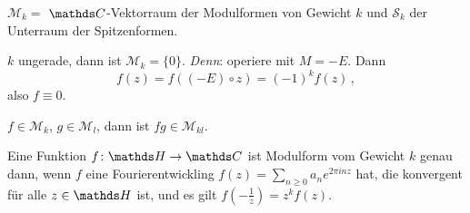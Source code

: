 \begin{nota}
$\mathcal{M}_k =$ $\CC$-Vektorraum der Modulformen von Gewicht $k$ und $\mathcal{S}_k$ der Unterraum der Spitzenformen.
\end{nota}

\begin{beme-list}
\item $k$ ungerade, dann ist $\mathcal{M}_k = \{0\}$.
\emph{Denn}: operiere mit $M = -E$. Dann
\[
    f(z) = f((-E) \circ z) = (-1)^k f(z)
    \,,
\]
also $f \equiv 0$.
\item $f \in \mathcal{M}_k$, $g\in \mathcal{M}_l$, dann ist $fg \in \mathcal{M}_{kl}$.
\item Eine Funktion $f\colon \HH \ra \CC$ ist Modulform vom Gewicht $k$ genau dann, wenn $f$ eine Fourierentwickling $f(z) = \sum_{n\geq 0} a_ne^{2\pi inz}$ hat, die konvergent für alle $z\in \HH$ ist, und es gilt $f(-\frac{1}{z}) = z^kf(z)$.
\end{beme-list}